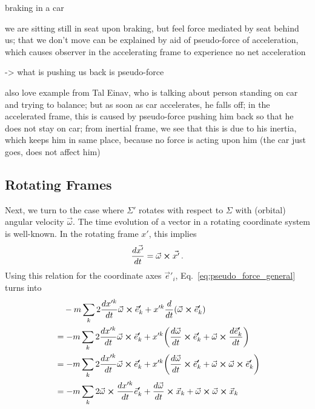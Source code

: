 \documentclass[../class_mech_main.tex]{subfiles}
\begin{document}
\begin{ex}[Braking]
	braking in a car

	we are sitting still in seat upon braking, but feel force mediated by seat behind us; that we don't move can be explained by aid of pseudo-force of acceleration, which causes observer in the accelerating frame to experience no net acceleration

	-> what is pushing us back is pseudo-force


	also love example from Tal Einav, who is talking about person standing on car and trying to balance; but as soon as car accelerates, he falls off; in the accelerated frame, this is caused by pseudo-force pushing him back so that he does not stay on car; from inertial frame, we see that this is due to his inertia, which keeps him in same place, because no force is acting upon him (the car just goes, does not affect him)
\end{ex}




        \subsection{Rotating Frames}
Next, we turn to the case where $\Sigma'$ rotates with respect to $\Sigma$ with (orbital) angular velocity $\vec{\omega}$. The time evolution of a vector in a rotating coordinate system is well-known.  In the rotating frame $x'$, this implies
\begin{equation}
    \dv{\vec{x'}}{t} = \vec{\omega} \cross \vec{x'} \, .
\end{equation}
Using this relation for the coordinate axes $\vec{e}'_i$, Eq.~\eqref{eq:pseudo_force_general} turns into
\begin{align}
	&\quad - m \sum_k 2 \dv{x'^k}{t} \vec{\omega} \cross \vec{e}'_k + x'^k \dv{t} \qty(\vec{\omega} \cross \vec{e}'_k)
	\notag\\
	&= - m \sum_k 2 \dv{x'^k}{t} \vec{\omega} \cross \vec{e}'_k + x'^k \qty(\dv{\vec{\omega}}{t} \cross \vec{e}'_k + \vec{\omega} \cross \dv{\vec{e}'_k}{t})
	\notag\\
	&= - m \sum_k 2 \dv{x'^k}{t} \vec{\omega} \cross \vec{e}'_k + x'^k \qty(\dv{\vec{\omega}}{t} \cross \vec{e}'_k + \vec{\omega} \cross \vec{\omega} \cross \vec{e}'_k)
	\notag\\
	&= - m \sum_k 2 \vec{\omega} \cross \dv{x'^k}{t} \vec{e}'_k + \dv{\vec{\omega}}{t} \cross \vec{x}_k + \vec{\omega} \cross \vec{\omega} \cross \vec{x}_k
    \label{eq:pseudo_force_rot_frame}
\end{align}
\end{document}
